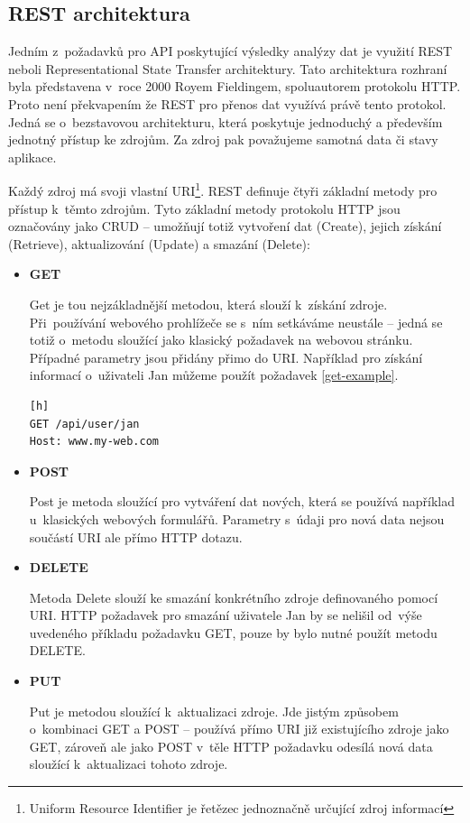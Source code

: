 \documentclass[thesis=B,czech]{FITthesis}[2012/06/26]
\begin{document}
\subsection{REST architektura}
	Jedním z~požadavků pro API poskytující výsledky analýzy dat je využití REST neboli Representational State Transfer architektury. Tato architektura rozhraní byla představena v~roce 2000 Royem Fieldingem, spoluautorem protokolu HTTP\cite{rest-diser}. Proto není překvapením že REST pro přenos dat využívá právě tento protokol. Jedná se o~bezstavovou architekturu, která poskytuje jednoduchý a především jednotný přístup ke zdrojům. Za zdroj pak považujeme samotná data či stavy aplikace. 
	
	Každý zdroj má svoji vlastní URI\footnote{Uniform Resource Identifier je řetězec jednoznačně určující zdroj informací}. REST definuje čtyři základní metody pro přístup k~těmto zdrojům. Tyto základní metody protokolu HTTP jsou označovány jako CRUD -- umožňují totiž vytvoření dat (Create), jejich získání (Retrieve), aktualizování (Update) a smazání (Delete):
\begin{itemize}

\item\textbf{GET}

Get je tou nejzákladnější metodou, která slouží k~získání zdroje. Při~používání webového prohlížeče se s~ním setkáváme neustále -- jedná se totiž o~metodu sloužící jako klasický požadavek na webovou stránku. Případné parametry jsou přidány přimo do URI. Například pro získání informací o~uživateli Jan můžeme použít požadavek \ref{get-example}.
\begin{lstlisting}[caption={Ukázka požadavku GET},label=get-example][h]
GET /api/user/jan
Host: www.my-web.com
\end{lstlisting}

\item\textbf{POST}

Post je metoda sloužící pro vytváření dat nových, která se používá například u~klasických webových formulářů. Parametry s~údaji pro nová data nejsou součástí URI ale přímo HTTP dotazu. 

\item\textbf{DELETE}

Metoda Delete slouží ke smazání konkrétního zdroje definovaného pomocí URI. HTTP požadavek pro smazání uživatele Jan by se nelišil od~výše uvedeného příkladu požadavku GET, pouze by bylo nutné použít metodu DELETE. 

\item\textbf{PUT}

Put je metodou sloužící k~aktualizaci zdroje. Jde jistým způsobem o~kombinaci GET a POST -- používá přímo URI již existujícího zdroje jako GET, zároveň ale jako POST v~těle HTTP požadavku odesílá nová data sloužící k~aktualizaci tohoto zdroje. 

\end{itemize}
\end{document}
